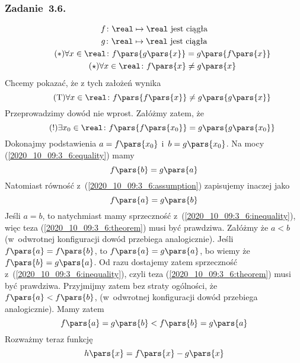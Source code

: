 \subsubsection*{Zadanie~3.6.}
\begin{gather*}
    f\colon \real \mapsto \real \text{ jest ciągła}\\
    g\colon \real \mapsto \real \text{ jest ciągła}\\
    \tag{\(\ast\)} \forall x \in \real\colon f\pars{g\pars{x}} = g\pars{f\pars{x}} \label{2020_10_09:3_6:equality}\\
    \tag{\(\star\)} \forall x \in \real\colon f\pars{x} \neq g\pars{x} \label{2020_10_09:3_6:inequality}
\end{gather*}
Chcemy pokazać, że z tych założeń wynika
\begin{equation*}
    \tag{T} \forall x \in \real\colon f\pars{f\pars{x}} \neq g\pars{g\pars{x}} \label{2020_10_09:3_6:theorem}
\end{equation*}
Przeprowadzimy dowód nie wprost. Załóżmy zatem, że
\begin{equation*}
    \tag{!} \exists x_0 \in \real\colon f\pars{f\pars{x_0}} = g\pars{g\pars{x_0}} \label{2020_10_09:3_6:assumption}
\end{equation*}
Dokonajmy podstawienia \(a = f\pars{x_0}\) i~\(b = g\pars{x_0}\). Na mocy (\ref{2020_10_09:3_6:equality}) mamy
\begin{equation*}
    f\pars{b} = g\pars{a}
\end{equation*}
Natomiast równość z~(\ref{2020_10_09:3_6:assumption}) zapisujemy inaczej jako
\begin{equation*}
    f\pars{a} = g\pars{b}
\end{equation*}
Jeśli \(a = b\), to natychmiast mamy sprzeczność z~(\ref{2020_10_09:3_6:inequality}), więc teza (\ref{2020_10_09:3_6:theorem}) musi być prawdziwa. Załóżmy że \(a < b\) (w~odwrotnej konfiguracji dowód przebiega analogicznie). Jeśli \(f\pars{a} = f\pars{b}\), to \(f\pars{a} = g\pars{a}\), bo wiemy że \(f\pars{b} = g\pars{a}\). Od razu dostajemy zatem sprzeczność z~(\ref{2020_10_09:3_6:inequality}), czyli teza (\ref{2020_10_09:3_6:theorem}) musi być prawdziwa. Przyjmijmy zatem bez straty ogólności, że \(f\pars{a} < f\pars{b}\), (w~odwrotnej konfiguracji dowód przebiega analogicznie). Mamy zatem
\begin{equation*}
    f\pars{a} = g\pars{b} < f\pars{b} = g\pars{a}
\end{equation*}
Rozważmy teraz funkcję
\begin{equation*}
    h\pars{x} = f\pars{x} - g\pars{x}
\end{equation*}
